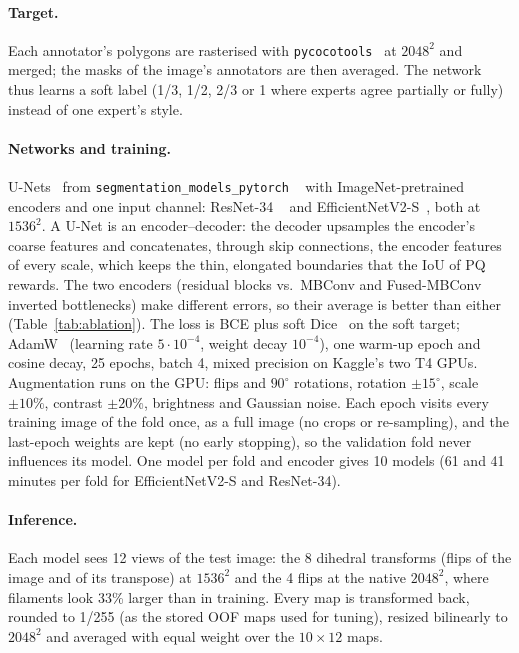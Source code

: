 \documentclass[sigconf]{acmart}
\begin{document}
\paragraph{Target.} Each annotator's polygons are rasterised with \texttt{pycoco\-tools}~\cite{lin2014coco} at $2048^2$ and
merged; the masks of the image's annotators are then averaged. The network thus learns a soft label (1/3, 1/2, 2/3 or 1
where experts agree partially or fully) instead of one expert's style.

\paragraph{Networks and training.} U-Nets~\cite{ronneberger2015unet} from \texttt{segmentation\_\allowbreak{}models\_\allowbreak{}pytorch}%
~\cite{iakubovskii2019smp} with ImageNet-pretrained~\cite{deng2009imagenet} encoders and one input channel: ResNet-34%
~\cite{he2016resnet} and EfficientNetV2-S~\cite{tan2021efficientnetv2,wightman2019timm}, both at $1536^2$. A U-Net is an
encoder--decoder: the decoder upsamples the encoder's coarse features and concatenates, through skip connections, the
encoder features of every scale, which keeps the thin, elongated boundaries that the IoU of PQ rewards. The two encoders
(residual blocks vs.\ MBConv and Fused-MBConv inverted bottlenecks) make different errors, so their average is better
than either (Table~\ref{tab:ablation}). The loss is BCE
plus soft Dice~\cite{milletari2016vnet} on the soft target; AdamW~\cite{loshchilov2019adamw} (learning rate $5\cdot10^{-4}$,
weight decay $10^{-4}$), one warm-up epoch and cosine decay, 25 epochs, batch 4, mixed precision on Kaggle's two T4 GPUs.
Augmentation runs on the GPU: flips and $90^\circ$ rotations, rotation $\pm15^\circ$, scale $\pm10\%$, contrast $\pm20\%$,
brightness and Gaussian noise. Each epoch visits every training image of the fold once, as a full image (no crops or
re-sampling), and the last-epoch weights are kept (no early stopping), so the validation fold never influences its model.
One model per fold and encoder gives 10 models (61 and 41 minutes per fold for EfficientNetV2-S and ResNet-34).

\paragraph{Inference.} Each model sees 12 views of the test image: the 8 dihedral transforms (flips of the image and of
its transpose) at $1536^2$ and the 4 flips at the native $2048^2$, where filaments look 33\% larger than in training. Every
map is transformed back, rounded to 1/255 (as the stored OOF maps used for tuning), resized bilinearly to $2048^2$ and
averaged with equal weight over the $10\times12$ maps.
\end{document}
